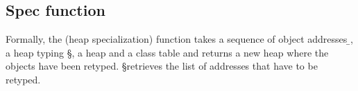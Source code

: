 \documentclass[a4paper,USenglish]{tex/lipics-v2016}
\begin{document}
\begin{mathpar}


\end{mathpar}

\subsection{Spec function}\label{mono:spec}

Formally, the  (heap specialization) function takes a
sequence of object addresses \b\a, a heap typing \S, a heap \s
and a class table \K and returns a new heap where the objects
have been retyped. \Dom\S retrieves the list of addresses 
that have to be retyped.

\begin{mathpar}

\end{mathpar}
\end{document}
